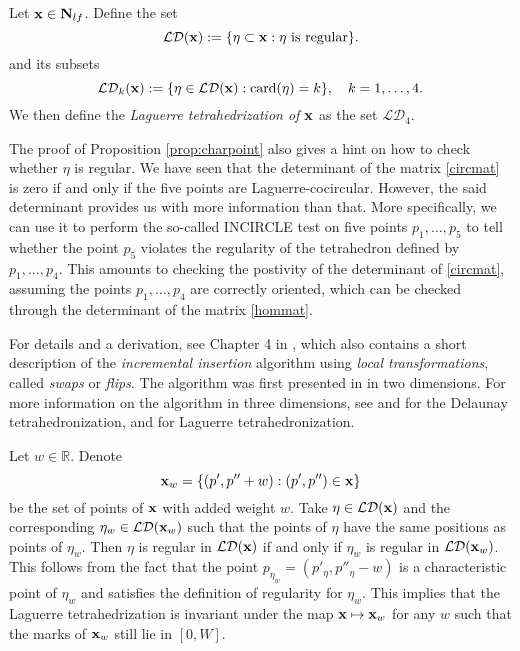 \begin{definition}
	Let ${\mathbf{x}} \in \mathbf N_{lf}$. Define the set 
	$$\mathcal {LD}({\mathbf{x}}) := \{\eta\subset {\mathbf{x}}: \eta \text{ is regular}\}.$$
	and its subsets
	$$\mathcal {LD}_k({\mathbf{x}}) := \{\eta \in \mathcal {LD}({\mathbf{x}}): \mathrm{card}(\eta)=k \},\quad k = 1,\dots,4.$$
	We then define the \textit{Laguerre tetrahedrization of ${\mathbf{x}}$} as the set $\mathcal {LD}_4$. 
\end{definition}



\begin{remark}\label{r:construct}
	The proof of Proposition \ref{prop:charpoint} also gives a hint on how to check whether $\eta$ is regular. We have seen that the determinant of the matrix \eqref{circmat} is zero if and only if the five points are Laguerre-cocircular. However, the said determinant provides us with more information than that. More specifically, we can use it to perform the so-called INCIRCLE test on five points $p_1,\dots, p_5$ to tell whether the point $p_5$ violates the regularity of the tetrahedron defined by $p_1,\dots, p_4$. This amounts to checking the postivity of the determinant of \eqref{circmat}, assuming the points $p_1,\dots, p_4$ are correctly oriented, which can be checked through the determinant of the matrix \eqref{hommat}. \newline
	
	For details and a derivation, see Chapter 4 in \cite{Gavrilova}, which also contains a short description of the \textit{incremental insertion} algorithm using \textit{local transformations}, called \textit{swaps} or \textit{flips}. The algorithm was first presented in \cite{Lawson72} in two dimensions. For more information on the algorithm in three dimensions, see \cite{Joe89} and \cite{Joe91} for the Delaunay tetrahedronization, and \cite{Edelsbrunner1996} for Laguerre tetrahedronization.
\end{remark}



\begin{remark}\label{rem:invariance}
	Let $w\in \mathbb R$. Denote 
	$${\mathbf{x}}_w = \{(p',p''+w): (p',p'')\in{\mathbf{x}}\}$$ be the set of points of ${\mathbf{x}}$ with added weight $w$. Take $\eta \in \mathcal {LD}({\mathbf{x}})$ and the corresponding $\eta_w \in \mathcal {LD}({\mathbf{x}}_w)$ such that the points of $\eta$ have the same positions as points of $\eta_w$. Then $\eta$ is regular in $\mathcal {LD}({\mathbf{x}})$ if and only if $\eta_w$ is  regular in $\mathcal {LD}({\mathbf{x}}_w)$. This follows from the fact that the point $p_{\eta_w} = (p'_{\eta}, p''_{\eta} -w)$ is a characteristic point of $\eta_w$ and satisfies the definition of regularity for $\eta_w$. This implies that the Laguerre tetrahedrization is invariant under the map ${\mathbf{x}} \mapsto {\mathbf{x}}_w$ for any $w$ such that the marks of ${\mathbf{x}}_w$ still lie in $[0,W]$.
\end{remark}

